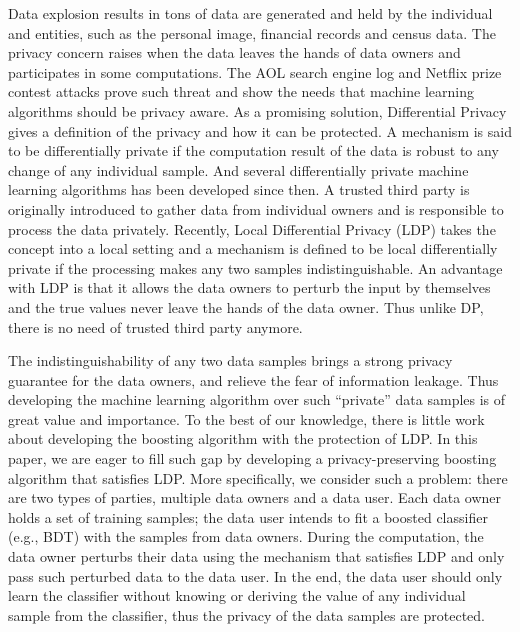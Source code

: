 \documentclass[10pt,journal,compsoc]{IEEEtran}
\begin{document}
Data explosion results in tons of data are generated and held by the individual and entities, such as the personal image, financial records and census data. The privacy concern raises when the data leaves the hands of data owners and participates in some computations. The AOL search engine log\cite{shen2007privacy} and Netflix prize contest\cite{narayanan2008robust} attacks prove such threat and show the needs that machine learning algorithms should be privacy aware. As a promising solution, Differential Privacy \cite{Dwork2006DP} gives a definition of the privacy and how it can be protected. A mechanism is said to be differentially private if the computation result of the data is robust to any change of any individual sample. And several differentially private machine learning algorithms\cite{ji2014differential} has been developed since then. A trusted third party is originally introduced to gather data from individual owners and is responsible to process the data privately. Recently, Local Differential Privacy (LDP)\cite{duchi2013local,wang2017locally} takes the concept into a local setting and a mechanism is defined to be local differentially private if the processing makes any two samples indistinguishable. An advantage with LDP is that it allows the data owners to perturb the input by themselves and the true values never leave the hands of the data owner. Thus unlike DP, there is no need of trusted third party anymore.

The indistinguishability of any two data samples brings a strong privacy guarantee for the data owners, and relieve the fear of information leakage. Thus developing the machine learning algorithm over such ``private'' data samples is of great value and importance. To the best of our knowledge, there is little work about developing the boosting algorithm with the protection of LDP. In this paper, we are eager to fill such gap by developing a privacy-preserving boosting algorithm that satisfies LDP. More specifically, we consider such a problem: there are two types of parties, multiple data owners and a data user. Each data owner holds a set of training samples; the data user intends to fit a boosted classifier (e.g., BDT) with the samples from data owners. During the computation, the data owner perturbs their data using the mechanism that satisfies LDP and only pass such perturbed data to the data user. In the end, the data user should only learn the classifier without knowing or deriving the value of any individual sample from the classifier, thus the privacy of the data samples are protected.
\end{document}
